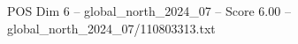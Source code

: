 \begin{textsample}{POS Dim 6 – global\_north\_2024\_07 – Score 6.00 – global\_north\_2024\_07/110803313.txt}
\end{textsample}
